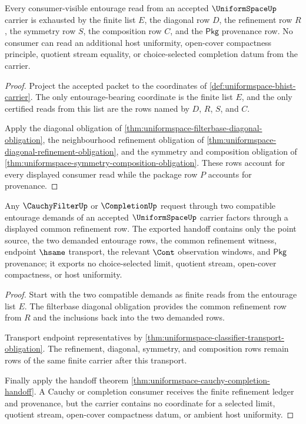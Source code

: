 \begin{theorem}
\label{thm:uniformspace-entourage-ledger-exactness}
Every consumer-visible entourage read from an accepted $\UniformSpaceUp$
carrier is exhausted by the finite list $E$, the diagonal row $D$, the
refinement row $R$, the symmetry row $S$, the composition row $C$, and the
$\mathsf{Pkg}$ provenance row. No consumer can read an additional host
uniformity, open-cover compactness principle, quotient stream equality, or
choice-selected completion datum from the carrier.
\end{theorem}
\begin{proof}
Project the accepted packet to the coordinates of
\autoref{def:uniformspace-bhist-carrier}. The only entourage-bearing
coordinate is the finite list $E$, and the only certified reads from this list
are the rows named by $D$, $R$, $S$, and $C$.

Apply the diagonal obligation of
\autoref{thm:uniformspace-filterbase-diagonal-obligation}, the neighbourhood
refinement obligation of
\autoref{thm:uniformspace-diagonal-refinement-obligation}, and the symmetry
and composition obligation of
\autoref{thm:uniformspace-symmetry-composition-obligation}. These rows account
for every displayed consumer read while the package row $P$ accounts for
provenance.
\end{proof}

\begin{theorem}
\label{thm:uniformspace-common-refinement-cauchy-handoff}
Any $\CauchyFilterUp$ or $\CompletionUp$ request through two compatible
entourage demands of an accepted $\UniformSpaceUp$ carrier factors through a
displayed common refinement row. The exported handoff contains only the point
source, the two demanded entourage rows, the common refinement witness,
endpoint $\hsame$ transport, the relevant $\Cont$ observation windows, and
$\mathsf{Pkg}$ provenance; it exports no choice-selected limit, quotient
stream, open-cover compactness, or host uniformity.
\end{theorem}
\begin{proof}
Start with the two compatible demands as finite reads from the entourage list
$E$. The filterbase diagonal obligation provides the common refinement row
from $R$ and the inclusions back into the two demanded rows.

Transport endpoint representatives by
\autoref{thm:uniformspace-classifier-transport-obligation}. The refinement,
diagonal, symmetry, and composition rows remain rows of the same finite
carrier after this transport.

Finally apply the handoff theorem
\autoref{thm:uniformspace-cauchy-completion-handoff}. A Cauchy or completion
consumer receives the finite refinement ledger and provenance, but the carrier
contains no coordinate for a selected limit, quotient stream, open-cover
compactness datum, or ambient host uniformity.
\end{proof}

